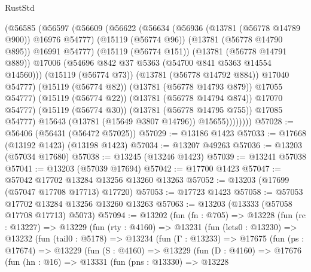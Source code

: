 \begin{lexlean}{RustStd}
\begin{coremodule}
                      (@56585
                        (@56597
                          (@56609
                            (@56622
                              (@56634
                                (@56936 (@13781 (@56778 @14789 @900)) @16976 @54777)
                                (@15119 (@56774 @96))
                                (@13781 (@56778 @14790 @895))
                                @16991
                                @54777)
                              (@15119 (@56774 @151))
                              (@13781 (@56778 @14791 @889))
                              @17006
                              (@54696 @842 @37 @5363 (@54700 @841 @5363 @14554 @14560)))
                            (@15119 (@56774 @73))
                            (@13781 (@56778 @14792 @884))
                            @17040
                            @54777)
                          (@15119 (@56774 @82))
                          (@13781 (@56778 @14793 @879))
                          @17055
                          @54777)
                        (@15119 (@56774 @22))
                        (@13781 (@56778 @14794 @874))
                        @17070
                        @54777)
                      (@15119 (@56774 @30))
                      (@13781 (@56778 @14795 @755))
                      @17085
                      @54777)
                    @15643
                    (@13781 (@15649 @3807 @14796))
                    @15655))))))))
@57028 := @56406 (@56431 (@56472 @57025))
@57029 := @13186 @1423
@57033 := @17668 (@13192 @1423) (@13198 @1423)
@57034 := @13207 @49263
@57036 := @13203 (@57034 @17680)
@57038 := @13245 (@13246 @1423)
@57039 := @13241 @57038
@57041 := @13203 (@57039 @17694)
@57042 := @17700 @1423
@57047 := @57042 @17702 @13284 @13256 @13260 @13263
@57052 := @13203 (@17699 (@57047 @17708 @17713) @17720)
@57053 := @17723 @1423
@57058 := @57053 @17702 @13284 @13256 @13260 @13263
@57063 := @13203 (@13333 (@57058 @17708 @17713) @5073)
@57094 := @13202
    (fun (fn : @705) =>
    @13228
      (fun (rc : @13227) =>
      @13229
        (fun (rty : @4160) =>
        @13231
          (fun (lets0 : @13230) =>
          @13232
            (fun (tail0 : @5178) =>
            @13234
              (fun (Γ : @13233) =>
              @17675
                (fun (ps : @17674) =>
                @13229
                  (fun (S : @4160) =>
                  @13229
                    (fun (D : @4160) =>
                    @17676
                      (fun (hn : @16) =>
                      @13331
                        (fun (pns : @13330) =>
                        @13228

\end{coremodule}
\end{lexlean}
